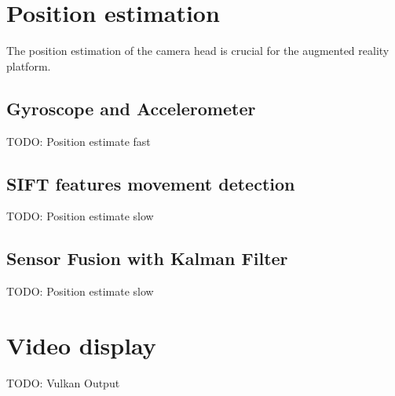 \section{Position estimation}
\label{sec:PositionEstimate}
The position estimation of the camera head is crucial for the augmented reality platform. 
\subsection{Gyroscope and Accelerometer}
\label{sec:GyroPosition}
TODO: Position estimate fast
\subsection{SIFT features movement detection}
\label{sec:SIFTPosition}
TODO: Position estimate slow
\subsection{Sensor Fusion with Kalman Filter}
\label{sec:SIFTPosition}
TODO: Position estimate slow
\section{Video display}
\label{sec:VideoDisplay}
TODO: Vulkan Output